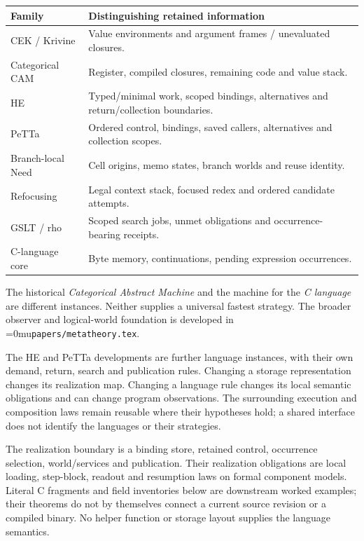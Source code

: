 \documentclass[11pt,a4paper]{article}
\newcommand{\name}[1]{\textup{\Urlmuskip=0mu\relax\nolinkurl{#1}}}
\begin{document}
\begin{tabularx}{\linewidth}{@{}lX@{}}
\toprule
Family & Distinguishing retained information \\
\midrule
CEK / Krivine & Value environments and argument frames / unevaluated closures. \\
Categorical CAM & Register, compiled closures, remaining code and value stack. \\
HE & Typed/minimal work, scoped bindings, alternatives and return/collection boundaries. \\
PeTTa & Ordered control, bindings, saved callers, alternatives and collection scopes. \\
Branch-local Need & Cell origins, memo states, branch worlds and reuse identity. \\
Refocusing & Legal context stack, focused redex and ordered candidate attempts. \\
GSLT / rho & Scoped search jobs, unmet obligations and occurrence-bearing receipts. \\
C-language core & Byte memory, continuations, pending expression occurrences. \\
\bottomrule
\end{tabularx}

The historical \emph{Categorical Abstract Machine} and the machine for the
\emph{C language} are different instances. Neither supplies a universal fastest
strategy. The broader observer and logical-world foundation is developed in
\name{papers/metatheory.tex}.

The HE and PeTTa developments are further language instances, with their own
demand, return, search and publication rules. Changing a storage representation
changes its realization map. Changing a language rule changes its local
semantic obligations and can change program observations. The surrounding
execution and composition laws remain reusable where their hypotheses hold;
a shared interface does not identify the languages or their strategies.

The realization boundary is a binding store, retained control, occurrence
selection, world/services and publication. Their realization obligations are
local loading, step-block, readout and resumption laws on formal component models. Literal C
fragments and field inventories below are downstream worked examples; their
theorems do not by themselves connect a current source revision or a compiled
binary. No helper function or storage layout supplies the language semantics.
\end{document}
